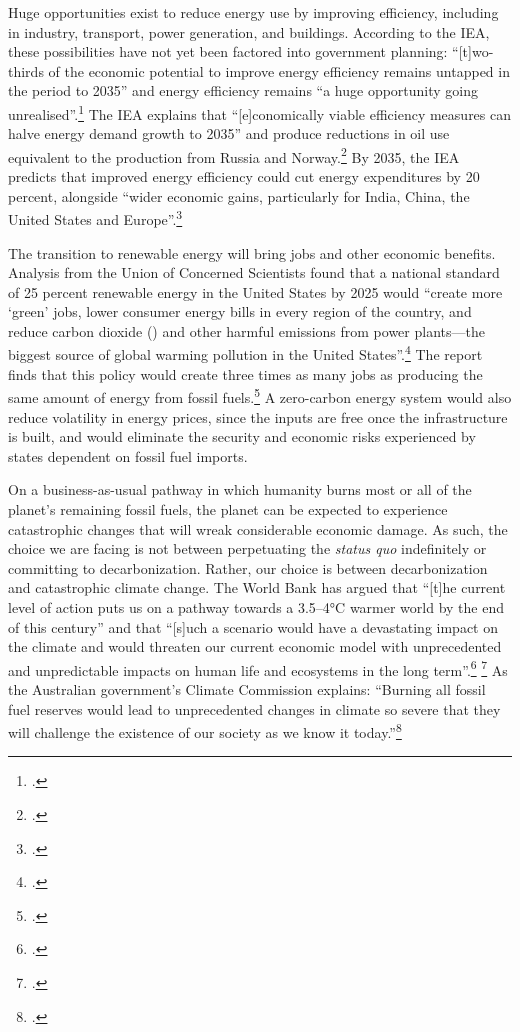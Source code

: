 \documentclass[10pt]{article}
\begin{document}
Huge opportunities exist to reduce energy use by improving efficiency, including in industry, transport, power generation, and buildings.
According to the IEA, these possibilities have not yet been factored into government planning: ``[t]wo-thirds of the economic potential to improve energy efficiency remains untapped in the period to 2035'' and energy efficiency remains ``a huge opportunity going unrealised''.\footcite[][p. 13]{IEA2012press}
The IEA explains that ``[e]conomically viable efficiency measures can halve energy demand growth to 2035'' and produce reductions in oil use equivalent to the production from Russia and Norway.\footcite[][p. 14]{IEA2012press}
By 2035, the IEA predicts that improved energy efficiency could cut energy expenditures by 20 percent, alongside ``wider economic gains, particularly for India, China, the United States and Europe''.\footcite[][p. 15]{IEA2012press}



The transition to renewable energy will bring jobs and other economic benefits.
Analysis from the Union of Concerned Scientists found that a national standard of 25 percent renewable energy in the United States by 2025 would ``create more `green' jobs, lower consumer energy bills in every region of the country, and reduce carbon dioxide () and other harmful emissions from power plants—the biggest source of global warming pollution in the United States''.\footcite[][]{ConcernedScientistsJobs}
The report finds that this policy would create three times as many jobs as producing the same amount of energy from fossil fuels.\footcite[See also: ][]{CSBenefitsRenewable}
A zero-carbon energy system would also reduce volatility in energy prices, since the inputs are free once the infrastructure is built, and would eliminate the security and economic risks experienced by states dependent on fossil fuel imports.



On a business-as-usual pathway in which humanity burns most or all of the planet's remaining fossil fuels, the planet can be expected to experience catastrophic changes that will wreak considerable economic damage.
As such, the choice we are facing is not between perpetuating the \emph{status quo} indefinitely or committing to decarbonization.
Rather, our choice is between decarbonization and catastrophic climate change.
The World Bank has argued that ``[t]he current level of action puts us on a pathway towards a 3.5–4°C warmer world by the end of this century'' and that ``[s]uch a scenario would have a devastating impact on the climate and would threaten our current economic model with unprecedented and unpredictable impacts on human life and ecosystems in the long term''.\footcite[][p. 13]{WorldBankCarbonPricing} \footcite[See also:][]{WoesReverse}
As the Australian government's Climate Commission explains: ``Burning all fossil fuel reserves would lead to unprecedented changes in climate so severe that they will challenge the existence of our society as we know it today.''\footcite[][p. 5]{CriticalDecade2013}
\end{document}
